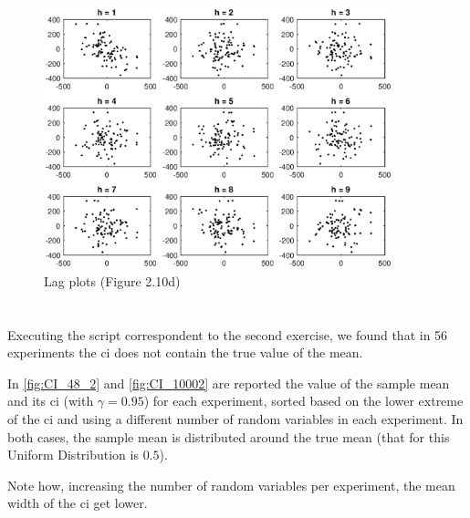 \documentclass[11pt,a4paper]{article}
\begin{document}
\begin{figure}[ht]
  \centering
  \includegraphics[width=0.9\textwidth]{ex1fig2_10d}
  \caption{Lag plots (Figure 2.10d)}
  \label{fig:lag_plot}
\end{figure}

\newpage
\section{}

Executing the script correspondent to the second exercise, we found that in 56 experiments the \gls{ci} does not contain the true value of the mean.

In \autoref{fig:CI_48_2} and \autoref{fig:CI_10002} are reported the value of the sample mean and its \gls{ci} (with $\gamma=0.95$) for each experiment, sorted based on the lower extreme of the \gls{ci} and using a different number of random variables in each experiment.
In both cases, the sample mean is distributed around the true mean (that for this Uniform Distribution is $0.5$).

Note how, increasing the number of random variables per experiment, the mean width of the \gls{ci} get lower.
\end{document}
